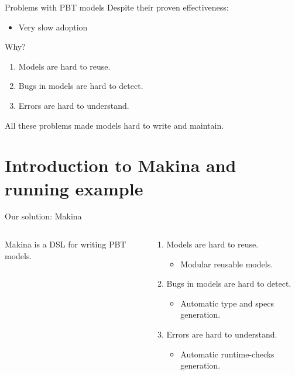 \documentclass[aspectratio=169, 10pt, handout]{beamer}
\begin{document}
\begin{frame}[label={sec:org6139db8}]{Problems with PBT models}
\onslide<+->
\onslide<+->
Despite their proven effectiveness:
\begin{itemize}
\item Very slow adoption
\end{itemize}

\vspace{10pt}
\onslide<+->
Why?

\vspace{10pt}

\begin{enumerate}
\item Models are hard to reuse.
\item Bugs in models are hard to detect.
\item Errors are hard to understand.
\end{enumerate}
\onslide<+->
\vspace{10pt}

All these problems made models hard to write and maintain.
\end{frame}

\section{Introduction to Makina and running example}
\label{sec:org4489ac3}
\begin{frame}[label={sec:org28d5101}]{Our solution: Makina}
\begin{columns}
\begin{column}{0.48\columnwidth}
Makina is a DSL for writing PBT models.
\onslide<+->

\vspace{10pt}
\end{column}

\begin{column}{0.48\columnwidth}
\begin{enumerate}
\item Models are hard to reuse.
\begin{itemize}
\item Modular reusable models. \vspace{10pt}
\end{itemize}
\item Bugs in models are hard to detect.
\begin{itemize}
\item Automatic type and specs generation. \vspace{10pt}
\end{itemize}
\item Errors are hard to understand.
\begin{itemize}
\item Automatic runtime-checks generation. \vspace{10pt}
\end{itemize}
\end{enumerate}
\end{column}
\end{columns}
\end{frame}
\end{document}
